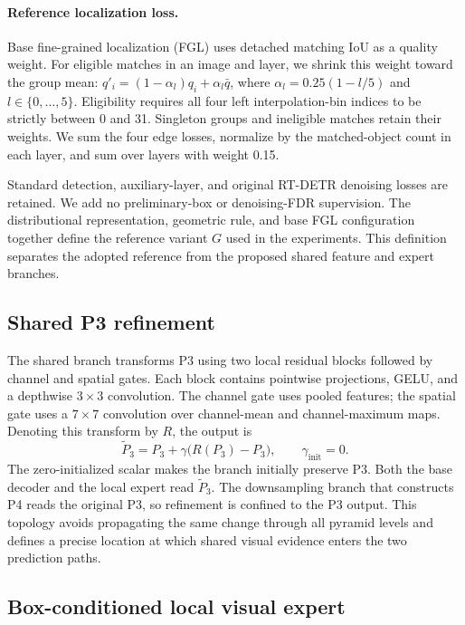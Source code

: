 \paragraph{Reference localization loss.}
Base fine-grained localization (FGL) uses detached matching IoU as a quality weight. For eligible matches in an image and layer, we shrink this weight toward the group mean: $q'_i=(1-\alpha_l)q_i+\alpha_l\bar q$, where $\alpha_l=0.25(1-l/5)$ and $l\in\{0,\ldots,5\}$. Eligibility requires all four left interpolation-bin indices to be strictly between 0 and 31. Singleton groups and ineligible matches retain their weights. We sum the four edge losses, normalize by the matched-object count in each layer, and sum over layers with weight 0.15.

Standard detection, auxiliary-layer, and original RT-DETR denoising losses are retained. We add no preliminary-box or denoising-FDR supervision. The distributional representation, geometric rule, and base FGL configuration together define the reference variant $G$ used in the experiments. This definition separates the adopted reference from the proposed shared feature and expert branches.

\subsection{Shared P3 refinement}
The shared branch transforms P3 using two local residual blocks followed by channel and spatial gates. Each block contains pointwise projections, GELU, and a depthwise $3\times3$ convolution. The channel gate uses pooled features; the spatial gate uses a $7\times7$ convolution over channel-mean and channel-maximum maps. Denoting this transform by $R$, the output is
\begin{equation}
\widetilde P_3=P_3+\gamma\bigl(R(P_3)-P_3\bigr),\qquad
\gamma_{\mathrm{init}}=0.
\label{eq:shared}
\end{equation}
The zero-initialized scalar makes the branch initially preserve P3. Both the base decoder and the local expert read $\widetilde P_3$. The downsampling branch that constructs P4 reads the original P3, so refinement is confined to the P3 output. This topology avoids propagating the same change through all pyramid levels and defines a precise location at which shared visual evidence enters the two prediction paths.

\subsection{Box-conditioned local visual expert}


